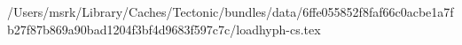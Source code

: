 /Users/msrk/Library/Caches/Tectonic/bundles/data/6ffe055852f8faf66c0acbe1a7fb27f87b869a90bad1204f3bf4d9683f597c7c/loadhyph-cs.tex